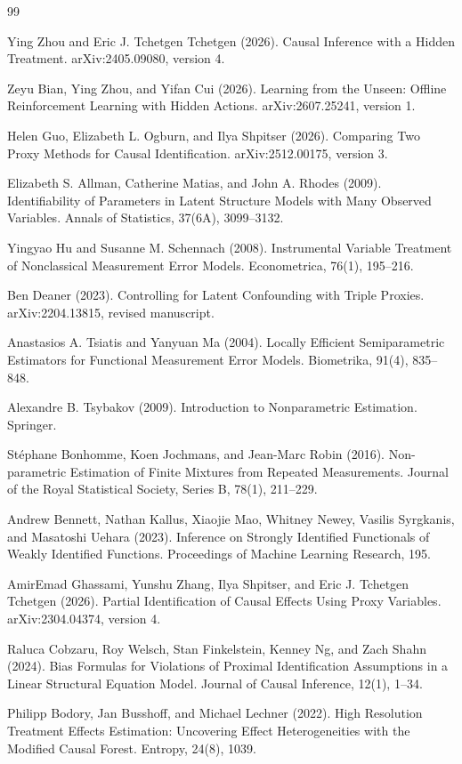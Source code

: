\documentclass{article}
\begin{document}
\begin{thebibliography}{99}

   Ying Zhou and Eric J. Tchetgen Tchetgen (2026). Causal Inference with a Hidden Treatment. arXiv:2405.09080, version 4.

   Zeyu Bian, Ying Zhou, and Yifan Cui (2026). Learning from the Unseen: Offline Reinforcement Learning with Hidden Actions. arXiv:2607.25241, version 1.

   Helen Guo, Elizabeth L. Ogburn, and Ilya Shpitser (2026). Comparing Two Proxy Methods for Causal Identification. arXiv:2512.00175, version 3.

   Elizabeth S. Allman, Catherine Matias, and John A. Rhodes (2009). Identifiability of Parameters in Latent Structure Models with Many Observed Variables. Annals of Statistics, 37(6A), 3099--3132.

   Yingyao Hu and Susanne M. Schennach (2008). Instrumental Variable Treatment of Nonclassical Measurement Error Models. Econometrica, 76(1), 195--216.

   Ben Deaner (2023). Controlling for Latent Confounding with Triple Proxies. arXiv:2204.13815, revised manuscript.

   Anastasios A. Tsiatis and Yanyuan Ma (2004). Locally Efficient Semiparametric Estimators for Functional Measurement Error Models. Biometrika, 91(4), 835--848.

   Alexandre B. Tsybakov (2009). Introduction to Nonparametric Estimation. Springer.

   St\'ephane Bonhomme, Koen Jochmans, and Jean-Marc Robin (2016). Non-parametric Estimation of Finite Mixtures from Repeated Measurements. Journal of the Royal Statistical Society, Series B, 78(1), 211--229.

   Andrew Bennett, Nathan Kallus, Xiaojie Mao, Whitney Newey, Vasilis Syrgkanis, and Masatoshi Uehara (2023). Inference on Strongly Identified Functionals of Weakly Identified Functions. Proceedings of Machine Learning Research, 195.

   AmirEmad Ghassami, Yunshu Zhang, Ilya Shpitser, and Eric J. Tchetgen Tchetgen (2026). Partial Identification of Causal Effects Using Proxy Variables. arXiv:2304.04374, version 4.

   Raluca Cobzaru, Roy Welsch, Stan Finkelstein, Kenney Ng, and Zach Shahn (2024). Bias Formulas for Violations of Proximal Identification Assumptions in a Linear Structural Equation Model. Journal of Causal Inference, 12(1), 1--34.

   Philipp Bodory, Jan Busshoff, and Michael Lechner (2022). High Resolution Treatment Effects Estimation: Uncovering Effect Heterogeneities with the Modified Causal Forest. Entropy, 24(8), 1039.

\end{thebibliography}
\end{document}
